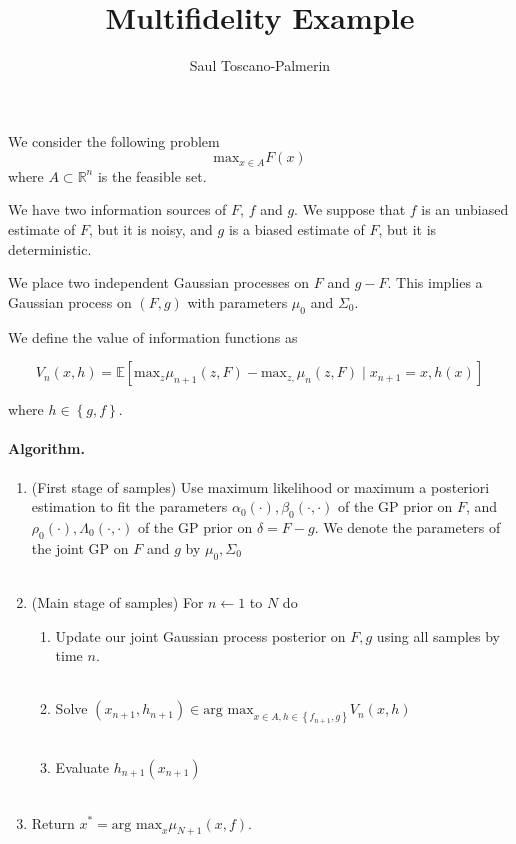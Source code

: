 \documentclass[12pt,english]{article}
\author{Saul Toscano-Palmerin}
\date{}
\begin{document}
\title{Multifidelity Example}

\maketitle
We consider the following problem
\[
\mbox{max}_{x\in A}F\left(x\right)
\]
where $A\subset\mathbb{R}^{n}$ is the feasible set.

We have two information sources of $F$, $f$ and $g$. We suppose that $f$
is an unbiased estimate of $F$, but it is noisy, and $g$ is a biased
estimate of $F$, but it is deterministic.

We place two independent Gaussian processes on $F$ and $g-F$. This implies a Gaussian process
on $(F,g)$ with parameters $\mu_{0}$ and $\Sigma_{0}$.

We define the value of information functions as

\[
V_{n}\left(x,h\right)=\mathbb{E}\left[\mbox{max}_{z}\mu_{n+1}\left(z,F\right)-\mbox{max}_{z,}\mu_{n}\left(z,F\right)\mid x_{n+1}=x,h\left(x\right)\right]
\]

where $h\in\left\{ g,f\right\} $.


\paragraph{Algorithm.}

\begin{enumerate}
\item (First stage of samples) Use maximum likelihood or maximum a posteriori estimation to fit the
parameters $\alpha_{0}\left(\cdot\right),\beta_{0}\left(\cdot,\cdot\right)$
of the GP prior on $F$, and $\rho_{0}\left(\cdot\right),\Lambda_{0}\left(\cdot,\cdot\right)$
of the GP prior on $\delta=F-g$. We denote the parameters of the joint GP on $F$ and $g$ by
$\mu_{0},\Sigma_{0}$\\
 \textrm{}\\
\item (Main stage of samples) For $n\leftarrow1$ to $N$ do
\begin{enumerate}
    \item Update our joint Gaussian process posterior on $F,g$ using all samples by time $n$.\\
    \textrm{}\\
\item Solve $\left(x_{n+1},h_{n+1}\right)\in\mbox{arg max}_{x\in A,h\in\left\{ f_{n+1},g\right\} }V_{n}\left(x,h\right)$\\
\textrm{}\\
\item Evaluate $h_{n+1}\left(x_{n+1}\right)$\\
\textrm{}\\
\end{enumerate}
\item Return $x^{*}=\mbox{arg max}_{x}\mu_{N+1}\left(x,f\right)$.
\end{enumerate}
\end{document}
